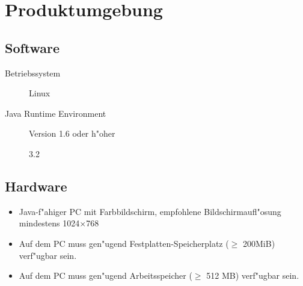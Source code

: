 \section{Produktumgebung}%

\subsection{Software}%

\begin{description}%
    \item [Betriebssystem] Linux%
    \item [Java Runtime Environment] Version 1.6 oder h"oher %
    \item [] 3.2%
\end{description}%

\subsection{Hardware}%


\begin{itemize}%
    \item Java-f"ahiger PC mit Farbbildschirm, empfohlene Bildschirmaufl"osung mindestens 1024$\times$768%
    \item Auf dem PC muss gen"ugend Festplatten-Speicherplatz ($\ge$ 200MiB) verf"ugbar sein.%
    \item Auf dem PC muss gen"ugend Arbeitsspeicher ($\ge$ 512 MB) verf"ugbar sein.%
\end{itemize}%
